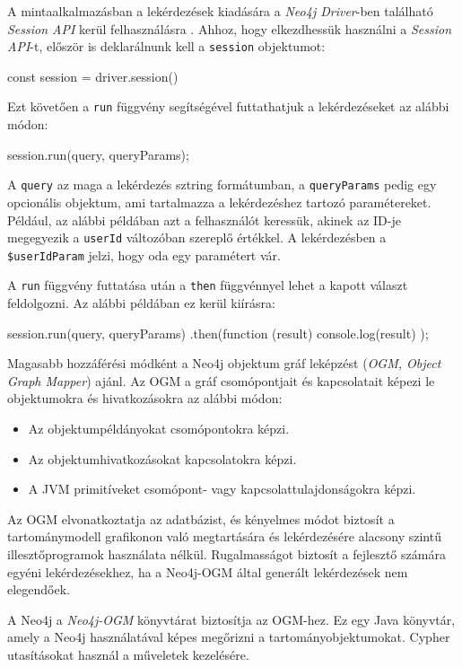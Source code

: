 A mintaalkalmazásban a lekérdezések kiadására a \textit{Neo4j Driver}-ben található \textit{Session API} kerül felhasználásra \cite{neo4j-session-api}. Ahhoz, hogy elkezdhessük használni a \textit{Session API}-t, először is deklarálnunk kell a \texttt{session} objektumot:
\begin{java}
const session = driver.session()
\end{java}

Ezt követően a \texttt{run} függvény segítségével futtathatjuk a lekérdezéseket az alábbi módon:
\begin{java}
session.run(query, queryParams);
\end{java}
 
A \texttt{query} az maga a lekérdezés sztring formátumban, a \texttt{queryParams} pedig egy opcionális objektum, ami tartalmazza a lekérdezéshez tartozó paramétereket. Például, az alábbi példában azt a felhasználót keressük, akinek az ID-je megegyezik a \texttt{userId} változóban szereplő értékkel. A lekérdezésben a \texttt{\$userIdParam} jelzi, hogy oda egy paramétert vár.

A \texttt{run} függvény futtatása után a \texttt{then} függvénnyel lehet a kapott választ feldolgozni. Az alábbi példában ez kerül kiírásra:
\begin{java}
session.run(query, queryParams)
  .then(function (result) {
    console.log(result)
  }
);
\end{java}

Magasabb hozzáférési módként a Neo4j objektum gráf leképzést (\textit{OGM, Object Graph Mapper}) ajánl. Az OGM a gráf csomópontjait és kapcsolatait képezi le objektumokra és hivatkozásokra az alábbi módon:
\begin{itemize}
    \item Az objektumpéldányokat csomópontokra képzi.
    \item Az objektumhivatkozásokat kapcsolatokra képzi.
    \item A JVM primitíveket csomópont- vagy kapcsolattulajdonságokra képzi.
\end{itemize}

Az OGM elvonatkoztatja az adatbázist, és kényelmes módot biztosít a tartománymodell grafikonon való megtartására és lekérdezésére alacsony szintű illesztőprogramok használata nélkül. Rugalmasságot biztosít a fejlesztő számára egyéni lekérdezésekhez, ha a Neo4j-OGM által generált lekérdezések nem elegendőek.

A Neo4j a \textit{Neo4j-OGM} könyvtárat biztosítja az OGM-hez. Ez egy Java könyvtár, amely a Neo4j használatával képes megőrizni a tartományobjektumokat. Cypher utasításokat használ a műveletek kezelésére.
